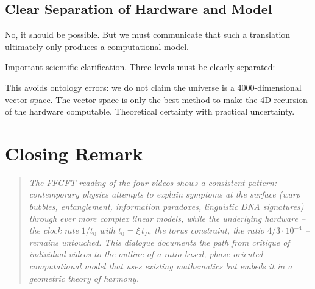 \subsection{Clear Separation of Hardware and Model}

\begin{userbox}
No, it should be possible. But we must communicate that such a translation ultimately only produces a computational model.
\end{userbox}

\begin{geminibox}
Important scientific clarification. Three levels must be clearly separated:

\begin{center}
\end{center}

This avoids ontology errors: we do not claim the universe is a 4000-dimensional vector space. The vector space is only the best method to make the 4D recursion of the hardware computable. Theoretical certainty with practical uncertainty.
\end{geminibox}

\section*{Closing Remark}

\begin{quote}
\itshape
The FFGFT reading of the four videos shows a consistent pattern: contemporary physics attempts to explain symptoms at the surface (warp bubbles, entanglement, information paradoxes, linguistic DNA signatures) through ever more complex linear models, while the underlying hardware -- the clock rate $1/t_0$ with $t_0 = \xi\,t_P$, the torus constraint, the ratio $4/3 \cdot 10^{-4}$ -- remains untouched. This dialogue documents the path from critique of individual videos to the outline of a ratio-based, phase-oriented computational model that uses existing mathematics but embeds it in a geometric theory of harmony.
\end{quote}
